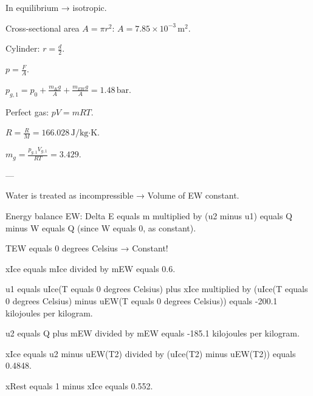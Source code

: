 In equilibrium → isotropic.  

Cross-sectional area \( A = \pi r^2 \):  
\( A = 7.85 \times 10^{-3} \, \text{m}^2 \).  

Cylinder:  
\( r = \frac{d}{2} \).  

\( p = \frac{F}{A} \).  

\( p_{g,1} = p_0 + \frac{m_K g}{A} + \frac{m_{EW} g}{A} = 1.48 \, \text{bar} \).  

Perfect gas:  
\( p V = m R T \).  

\( R = \frac{R}{M} = 166.028 \, \text{J/kg·K} \).  

\( m_g = \frac{p_{g,1} V_{g,1}}{R T} = 3.429 \).  

---

Water is treated as incompressible → Volume of EW constant.  

Energy balance EW:  
Delta E equals m multiplied by (u2 minus u1) equals Q minus W equals Q (since W equals 0, as constant).  

TEW equals 0 degrees Celsius → Constant!  

xIce equals mIce divided by mEW equals 0.6.  

u1 equals uIce(T equals 0 degrees Celsius) plus xIce multiplied by (uIce(T equals 0 degrees Celsius) minus uEW(T equals 0 degrees Celsius)) equals -200.1 kilojoules per kilogram.  

u2 equals Q plus mEW divided by mEW equals -185.1 kilojoules per kilogram.  

xIce equals u2 minus uEW(T2) divided by (uIce(T2) minus uEW(T2)) equals 0.4848.  

xRest equals 1 minus xIce equals 0.552.